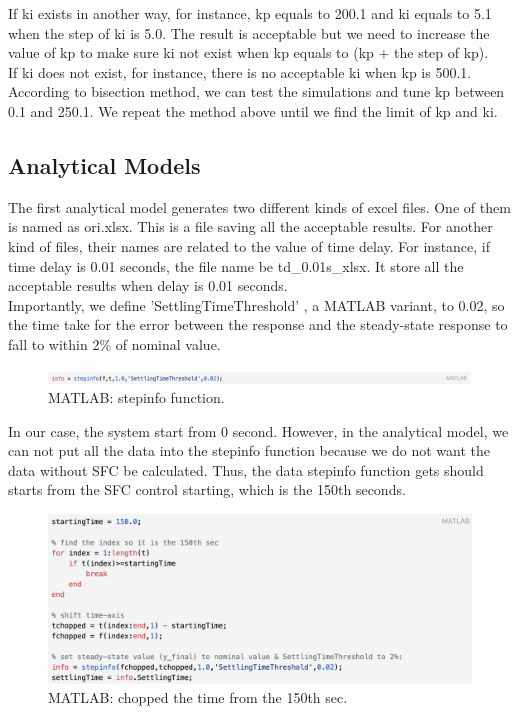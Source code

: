 \documentclass{report}
\begin{document}
If ki exists in another way, for instance, kp equals to 200.1 and ki equals to 5.1 when the step of ki is 5.0. The result is acceptable but we need to increase the value of kp to make sure ki not exist when kp equals to (kp + the step of kp).\\

If ki does not exist, for instance, there is no acceptable ki when kp is 500.1. According to bisection method, we can test the simulations and tune kp between 0.1 and 250.1. We repeat the method above until we find the limit of kp and ki.\\


\subsection{Analytical Models} %
\label{subsection3.4.2}
The first analytical model generates two different kinds of excel files. One of them is named as ori.xlsx. This is a file saving all the acceptable results. For another kind of files, their names are related to the value of time delay. For instance, if time delay is 0.01 seconds, the file name be td\_0.01s\_xlsx. It store all the acceptable results when delay is 0.01 seconds.\\

Importantly, we define 'SettlingTimeThreshold' , a MATLAB variant, to 0.02, so the time take for the error between the response and the steady-state response to fall to within 2\% of nominal value.\\

\begin{figure}[htbp]
\centering
\includegraphics[width = .999\textwidth]{figure/3_4_2_code4.png}
\caption{MATLAB: stepinfo function.}
\label{3_4_2_code4}
\end{figure}

In our case, the system start from 0 second. However, in the analytical model, we can not put all the data into the stepinfo function because we do not want the data without SFC be calculated. Thus, the data stepinfo function gets should starts from the SFC control starting, which is the 150th seconds. \\

\begin{figure}[htbp]
\centering
\includegraphics[width = .999\textwidth]{figure/3_4_2_chopped.png}
\caption{MATLAB: chopped the time from the 150th sec.}
\label{3_4_2_chopped}
\end{figure}
\end{document}
